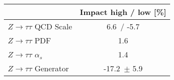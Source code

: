 \begin{tabular}{| l || c | }
\hline
 & Impact high / low  [\%]\tabularnewline
\hline
$Z\rightarrow\tau\tau$ QCD Scale & 6.6\, / -5.7 \tabularnewline
$Z\rightarrow\tau\tau$ PDF & 1.6 \tabularnewline
$Z\rightarrow\tau\tau$ $\alpha_s$ & 1.4 \tabularnewline
$Z\rightarrow\tau\tau$ Generator & -17.2\, $\pm$  5.9  \tabularnewline
\hline
\end{tabular}
